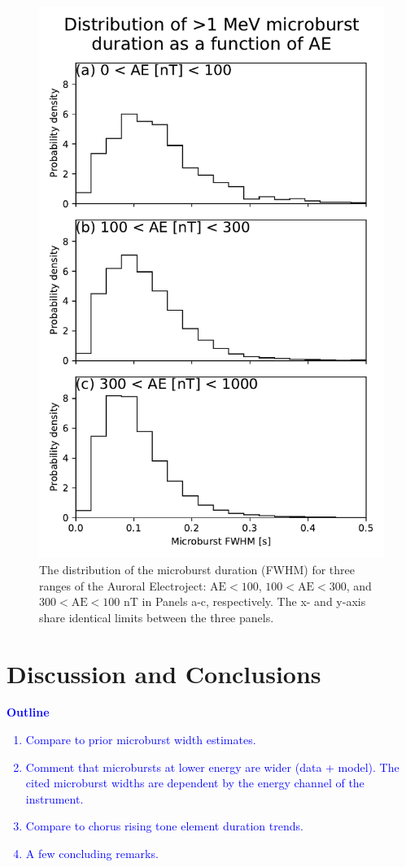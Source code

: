 \documentclass[draft]{agujournal2019}
\begin{document}
\begin{figure}
\noindent\includegraphics[width=\textwidth]{figures/fig4.pdf}
\caption{The distribution of the microburst duration (FWHM) for three ranges of the Auroral Electroject: $\mathrm{AE} < 100$, $100 < \mathrm{AE} < 300$, and $300 < \mathrm{AE} < 100$ nT in Panels a-c, respectively. The x- and y-axis share identical limits between the three panels.}
\label{fig4}
\end{figure}

\section{Discussion and Conclusions}\label{discussion}
\textcolor{blue}{
\textbf{Outline}
\begin{enumerate}
    \item Compare to prior microburst width estimates.
    \item Comment that microbursts at lower energy are wider (data + model). The cited microburst widths are dependent by the energy channel of the instrument. 
    \item Compare to chorus rising tone element duration trends.
    \item A few concluding remarks.
\end{enumerate}
}
\end{document}
